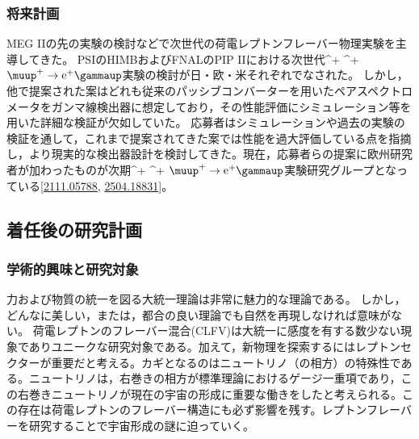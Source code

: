 \documentclass[11pt,a4paper,uplatex,dvipdfmx]{ujarticle} 		%
\newcommand{\研究課題名}{象の卵}
\newcommand{\研究機関名}{東京大学}
\newcommand{\研究代表者氏名}{内山雄祐}
\newcommand{\研究期間の最終元号年度}{6}  %
\newcommand*{\megc}{\ifmmode\muup^+ \to \mathrm{e}^+ \gammaup\else$\muup^+ \to \mathrm{e}^+ \gammaup$\fi}
\begin{document}
\subsubsection{将来計画}
MEG IIの先の実験の検討などで次世代の荷電レプトンフレーバー物理実験を主導してきた。
PSIのHIMBおよびFNALのPIP IIにおける次世代\megc 実験の検討が日・欧・米それぞれでなされた。
しかし，他で提案された案はどれも従来のパッシブコンバーターを用いたペアスペクトロメータをガンマ線検出器に想定しており，その性能評価にシミュレーション等を用いた詳細な検証が欠如していた。
応募者はシミュレーションや過去の実験の検証を通して，これまで提案されてきた案では性能を過大評価している点を指摘し\cite{jps2014a}，より現実的な検出器設計を検討してきた。現在，応募者らの提案に欧州研究者が加わったものが次期\megc 実験研究グループとなっている[\href{https://arxiv.org/abs/2111.05788}{2111.05788}, \href{https://arxiv.org/abs/2504.18831}{2504.18831}]。

\newpage
\subsection{着任後の研究計画}

\noindent

\vspace{-2zw}
\subsubsection{学術的興味と研究対象}

力および物質の統一を図る大統一理論は非常に魅力的な理論である。%
しかし，どんなに美しい，または，都合の良い理論でも自然を再現しなければ意味がない。%
荷電レプトンのフレーバー混合(CLFV)は大統一に感度を有する数少ない現象でありユニークな研究対象である。加えて，新物理を探索するにはレプトンセクターが重要だと考える。カギとなるのはニュートリノ（の相方）の特殊性である。ニュートリノは，右巻きの相方が標準理論におけるゲージ一重項であり，この右巻きニュートリノが現在の宇宙の形成に重要な働きをしたと考えられる。この存在は荷電レプトンのフレーバー構造にも必ず影響を残す。レプトンフレーバーを研究することで宇宙形成の謎に迫っていく。
\end{document}
